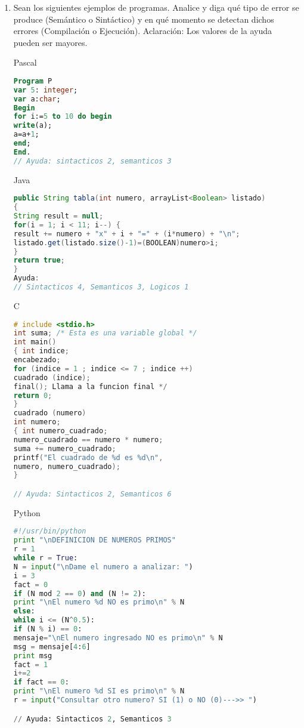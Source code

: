\documentclass[a4paper,10pt]{article}
\begin{document}
\begin{enumerate}
\begin{itemize}
\begin{center}
\end{center}
\end{itemize}

\item Sean los siguientes ejemplos de programas. Analice y diga qué tipo de error se produce (Semántico o Sintáctico) y en qué momento se detectan dichos errores (Compilación o Ejecución). Aclaración: Los valores de la ayuda pueden ser mayores.

\subitem Pascal
\begin{lstlisting}[language=Pascal]
Program P
var 5: integer;
var a:char;
Begin
for i:=5 to 10 do begin
write(a);
a=a+1;
end;
End.
// Ayuda: sintacticos 2, semanticos 3
\end{lstlisting}

\subitem Java
\begin{lstlisting}[language=Java]
public String tabla(int numero, arrayList<Boolean> listado)
{
String result = null;
for(i = 1; i < 11; i--) {
result += numero + "x" + i + "=" + (i*numero) + "\n";
listado.get(listado.size()-1)=(BOOLEAN)numero>i;
}
return true;
}
Ayuda:
// Sintacticos 4, Semanticos 3, Logicos 1
\end{lstlisting}

\newpage
\subitem C
\begin{lstlisting}[language=C]
# include <stdio.h>
int suma; /* Esta es una variable global */
int main()
{ int indice;
encabezado;
for (indice = 1 ; indice <= 7 ; indice ++)
cuadrado (indice);
final(); Llama a la funcion final */
return 0;
}
cuadrado (numero)
int numero;
{ int numero_cuadrado;
numero_cuadrado == numero * numero;
suma += numero_cuadrado;
printf("El cuadrado de %d es %d\n",
numero, numero_cuadrado);
}

// Ayuda: Sintacticos 2, Semanticos 6
\end{lstlisting}

\subitem Python
\begin{lstlisting}[language=Python]
#!/usr/bin/python
print "\nDEFINICION DE NUMEROS PRIMOS"
r = 1
while r = True:
N = input("\nDame el numero a analizar: ")
i = 3
fact = 0
if (N mod 2 == 0) and (N != 2):
print "\nEl numero %d NO es primo\n" % N
else:
while i <= (N^0.5):
if (N % i) == 0:
mensaje="\nEl numero ingresado NO es primo\n" % N
msg = mensaje[4:6]
print msg
fact = 1
i+=2
if fact == 0:
print "\nEl numero %d SI es primo\n" % N
r = input("Consultar otro numero? SI (1) o NO (0)--->> ")

// Ayuda: Sintacticos 2, Semanticos 3
\end{lstlisting}


\end{enumerate}
\end{document}
